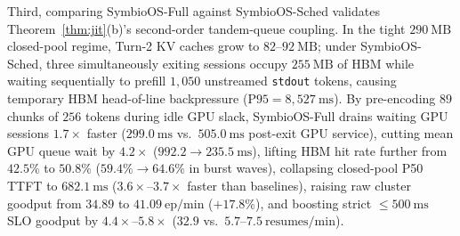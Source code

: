 \documentclass[10pt,journal,compsoc]{IEEEtran}
\theoremstyle{definition}
\theoremstyle{remark}
\newcommand{\SymbioSched}{\textup{\textsc{SymbioOS-Sched}}}
\newcommand{\SymbioFull}{\textup{\textsc{SymbioOS-Full}}}
\def\SymbioSched{SymbioOS-Sched}%
\def\SymbioFull{SymbioOS-Full}%
\begin{document}
Third, comparing \SymbioFull{} against \SymbioSched{} validates Theorem~\ref{thm:jit}(b)'s second-order tandem-queue coupling. In the tight $290~\mathrm{MB}$ closed-pool regime, Turn-2 KV caches grow to $82$--$92~\mathrm{MB}$; under \SymbioSched{}, three simultaneously exiting sessions occupy $255~\mathrm{MB}$ of HBM while waiting sequentially to prefill $1{,}050$ unstreamed \texttt{stdout} tokens, causing temporary HBM head-of-line backpressure ($\mathrm{P95} = 8{,}527~\mathrm{ms}$). By pre-encoding $89$ chunks of $256$ tokens during idle GPU slack, \SymbioFull{} drains waiting GPU sessions $1.7\times$ faster ($299.0~\mathrm{ms}$ vs.\ $505.0~\mathrm{ms}$ post-exit GPU service), cutting mean GPU queue wait by $4.2\times$ ($992.2 \to 235.5~\mathrm{ms}$), lifting HBM hit rate further from $42.5\%$ to $50.8\%$ ($59.4\% \to 64.6\%$ in burst waves), collapsing closed-pool P50 TTFT to $682.1~\mathrm{ms}$ ($3.6\times$--$3.7\times$ faster than baselines), raising raw cluster goodput from $34.89$ to $41.09~\mathrm{ep/min}$ ($+17.8\%$), and boosting strict $\le 500~\mathrm{ms}$ SLO goodput by $4.4\times$--$5.8\times$ ($32.9$ vs.\ $5.7$--$7.5~\mathrm{resumes/min}$).
\end{document}
